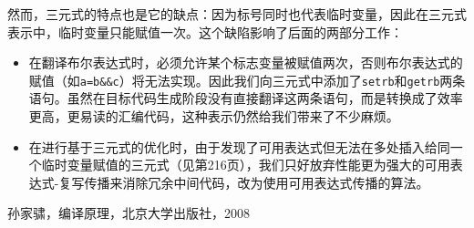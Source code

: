 然而，三元式的特点也是它的缺点：因为标号同时也代表临时变量，因此在三元式表示中，临时变量只能赋值一次。这个缺陷影响了后面的两部分工作：
\begin{itemize}
\item 在翻译布尔表达式时，必须允许某个标志变量被赋值两次，否则布尔表达式的赋值（如\verb|a=b&&c|）将无法实现。因此我们向三元式中添加了\verb|setrb|和\verb|getrb|两条语句。虽然在目标代码生成阶段没有直接翻译这两条语句，而是转换成了效率更高，更易读的汇编代码，这种表示仍然给我们带来了不少麻烦。
\item 在进行基于三元式的优化时，由于发现了可用表达式但无法在多处插入给同一个临时变量赋值的三元式（见\cite{sunjiasu}第216页），我们只好放弃性能更为强大的可用表达式-复写传播来消除冗余中间代码，改为使用可用表达式传播的算法。
\end{itemize}

\begin{thebibliography}{99}
孙家骕，编译原理，北京大学出版社，2008
\end{thebibliography}



